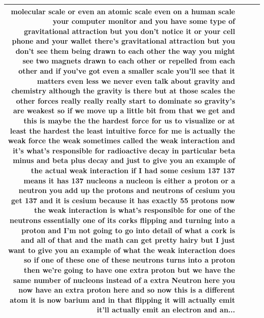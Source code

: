 \documentclass[10pt]{article}
\begin{document}
\begin{tiny}
\begin{longtable}{|r|p{0.375in}|p{1.275in}|p{3.5in}|}
molecular scale or even an atomic scale even on a human scale your computer monitor and you have some type of gravitational attraction but you don't notice it or your cell phone and your wallet there's gravitational attraction but you don't see them being drawn to each other the way you might see two magnets drawn to each other or repelled from each other and if you've got even a smaller scale you'll see that it matters even less we never even talk about gravity and chemistry although the gravity is there but at those scales the other forces really really really start to dominate so gravity's are weakest so if we move up a little bit from that we get and this is maybe the the hardest force for us to visualize or at least the hardest the least intuitive force for me is actually the weak force the weak sometimes called the weak interaction and it's what's responsible for radioactive decay in particular beta minus and beta plus decay and just to give you an example of the actual weak interaction if I had some cesium 137 137 means it has 137 nucleons a nucleon is either a proton or a neutron you add up the protons and neutrons of cesium you get 137 and it is cesium because it has exactly 55 protons now the weak interaction is what's responsible for one of the neutrons essentially one of its corks flipping and turning into a proton and I'm not going to go into detail of what a cork is and all of that and the math can get pretty hairy but I just want to give you an example of what the weak interaction does so if one of these one of these neutrons turns into a proton then we're going to have one extra proton but we have the same number of nucleons instead of a extra Neutron here you now have an extra proton here and so now this is a different atom it is now barium and in that flipping it will actually emit it'll actually emit an electron and an... \\\hline

\end{longtable}
\end{tiny}
\end{document}
